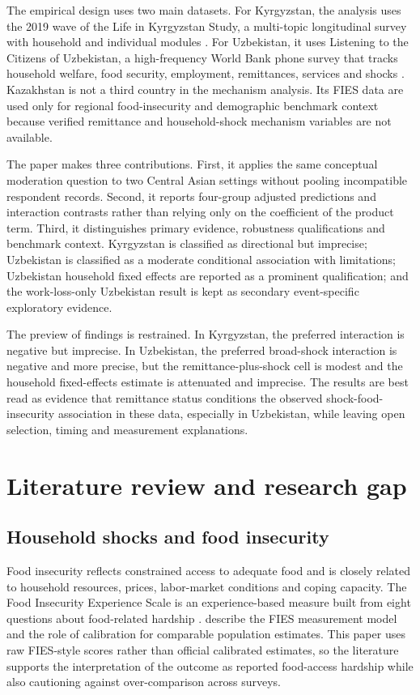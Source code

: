 \documentclass[11pt]{article}
\begin{document}
The empirical design uses two main datasets. For Kyrgyzstan, the analysis uses the 2019 wave of the Life in Kyrgyzstan Study, a multi-topic longitudinal survey with household and individual modules \parencite{LIK2023}. For Uzbekistan, it uses Listening to the Citizens of Uzbekistan, a high-frequency World Bank phone survey that tracks household welfare, food security, employment, remittances, services and shocks \parencite{WorldBank2025a,WorldBank2025b}. Kazakhstan is not a third country in the mechanism analysis. Its FIES data are used only for regional food-insecurity and demographic benchmark context because verified remittance and household-shock mechanism variables are not available.

The paper makes three contributions. First, it applies the same conceptual moderation question to two Central Asian settings without pooling incompatible respondent records. Second, it reports four-group adjusted predictions and interaction contrasts rather than relying only on the coefficient of the product term. Third, it distinguishes primary evidence, robustness qualifications and benchmark context. Kyrgyzstan is classified as directional but imprecise; Uzbekistan is classified as a moderate conditional association with limitations; Uzbekistan household fixed effects are reported as a prominent qualification; and the work-loss-only Uzbekistan result is kept as secondary event-specific exploratory evidence.

The preview of findings is restrained. In Kyrgyzstan, the preferred interaction is negative but imprecise. In Uzbekistan, the preferred broad-shock interaction is negative and more precise, but the remittance-plus-shock cell is modest and the household fixed-effects estimate is attenuated and imprecise. The results are best read as evidence that remittance status conditions the observed shock-food-insecurity association in these data, especially in Uzbekistan, while leaving open selection, timing and measurement explanations.

\section{Literature review and research gap}

\subsection{Household shocks and food insecurity}

Food insecurity reflects constrained access to adequate food and is closely related to household resources, prices, labor-market conditions and coping capacity. The Food Insecurity Experience Scale is an experience-based measure built from eight questions about food-related hardship \parencite{FAO2026}. \textcite{Cafiero2018} describe the FIES measurement model and the role of calibration for comparable population estimates. This paper uses raw FIES-style scores rather than official calibrated estimates, so the literature supports the interpretation of the outcome as reported food-access hardship while also cautioning against over-comparison across surveys.
\end{document}
